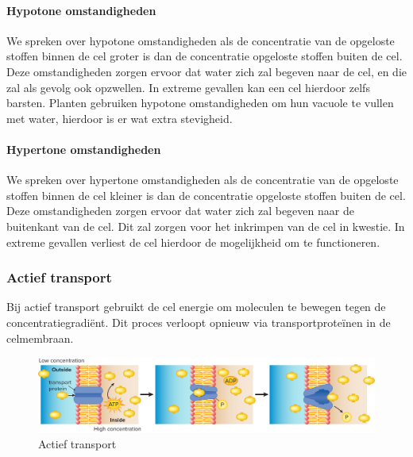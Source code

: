 \documentclass[a4paper,kul]{kulakarticle} %
\begin{document}
\paragraph{Hypotone omstandigheden}
We spreken over hypotone omstandigheden als de concentratie van de opgeloste stoffen binnen de cel groter is dan de concentratie opgeloste stoffen buiten de cel. Deze omstandigheden zorgen ervoor dat water zich zal begeven naar de cel, en die zal als gevolg ook opzwellen. In extreme gevallen kan een cel hierdoor zelfs barsten. Planten gebruiken hypotone omstandigheden om hun vacuole te vullen met water, hierdoor is er wat extra stevigheid.
\paragraph{Hypertone omstandigheden}
We spreken over hypertone omstandigheden als de concentratie van de opgeloste stoffen binnen de cel kleiner is dan de concentratie opgeloste stoffen buiten de cel. Deze omstandigheden zorgen ervoor dat water zich zal begeven naar de buitenkant van de cel. Dit zal zorgen voor het inkrimpen van de cel in kwestie. In extreme gevallen verliest de cel hierdoor de mogelijkheid om te functioneren. 
\subsubsection{Actief transport}
Bij actief transport gebruikt de cel energie om moleculen te bewegen tegen de concentratiegradiënt. Dit proces verloopt opnieuw via transportproteïnen in de celmembraan. 
\begin{figure}[h]
	\centering
	\includegraphics[width=0.7\linewidth]{"Actief transport"}
	\caption[Actief transport]{Actief transport}
	\label{fig:actief-transport}
\end{figure}
\end{document}
